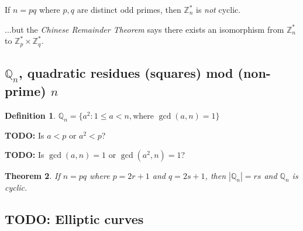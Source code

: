 \documentclass[12pt]{article}
\newtheorem{thm}{Theorem}[section]
\newtheorem{definition}[thm]{Definition}
\newcommand{\Zp}{\mathbb{Z}^{\ast}_p}
\newcommand{\Zq}{\mathbb{Z}^{\ast}_q}
\newcommand{\Zn}{\mathbb{Z}^{\ast}_n}
\newcommand{\Qn}{\mathbb{Q}_n}
\newcommand{\todo}{\textbf{TODO:} }
\newcommand{\sz}[1]{\left|#1\right|}
\begin{document}
If $n = pq$ where $p,q$ are distinct odd primes, then $\Zn$ is \emph{not} cyclic.

...but the \emph{Chinese Remainder Theorem} says there exists an isomorphism
from $\Zn$ to $\Zp \times \Zq$.

\subsection{$\Qn$, quadratic residues (squares) mod (non-prime) $n$}
\begin{definition}
$\Qn = \{a^2 : 1 \le a < n, \text{where } \gcd(a, n) = 1\}$
\end{definition}

\todo Is $a < p$ or $a^2 < p$?

\todo Is $\gcd(a, n) = 1$ or $\gcd(a^2, n) = 1$?

\begin{thm}
If $n = pq$ where $p = 2r+1$ and $q = 2s+1$, then $\sz{\Qn} = rs$ and
$\Qn$ is cyclic.
\end{thm}

\subsection{TODO: Elliptic curves}

\nocite{*}
\printbibliography
\end{document}
